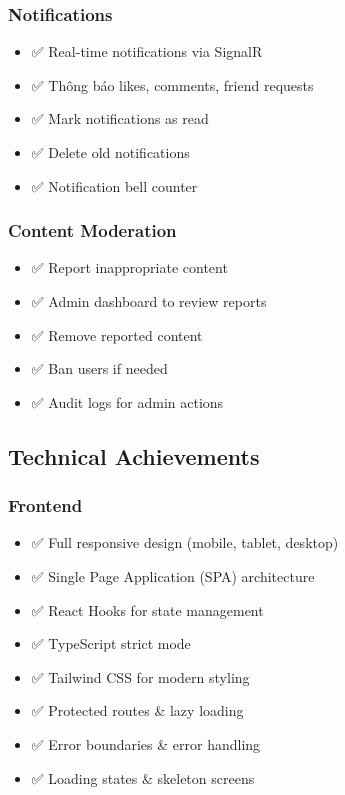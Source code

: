 \subsubsection{Notifications}
\begin{itemize}
    \item ✅ Real-time notifications via SignalR
    \item ✅ Thông báo likes, comments, friend requests
    \item ✅ Mark notifications as read
    \item ✅ Delete old notifications
    \item ✅ Notification bell counter
\end{itemize}

\subsubsection{Content Moderation}
\begin{itemize}
    \item ✅ Report inappropriate content
    \item ✅ Admin dashboard to review reports
    \item ✅ Remove reported content
    \item ✅ Ban users if needed
    \item ✅ Audit logs for admin actions
\end{itemize}

\subsection{Technical Achievements}

\subsubsection{Frontend}
\begin{itemize}
    \item ✅ Full responsive design (mobile, tablet, desktop)
    \item ✅ Single Page Application (SPA) architecture
    \item ✅ React Hooks for state management
    \item ✅ TypeScript strict mode
    \item ✅ Tailwind CSS for modern styling
    \item ✅ Protected routes \& lazy loading
    \item ✅ Error boundaries \& error handling
    \item ✅ Loading states \& skeleton screens
\end{itemize}

